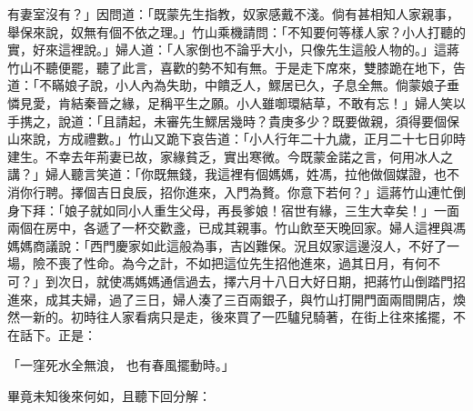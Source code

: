 有妻室沒有？」因問道：「既蒙先生指教，奴家感戴不淺。倘有甚相知人家親事，舉保來說，奴無有個不依之理。」竹山乘機請問：「不知要何等樣人家？小人打聽的實，好來這裡說。」婦人道：「人家倒也不論乎大小，只像先生這般人物的。」這蔣竹山不聽便罷，聽了此言，喜歡的勢不知有無。于是走下席來，雙膝跪在地下，告道：「不瞞娘子說，小人內為失助，中饋乏人，鰥居已久，子息全無。倘蒙娘子垂憐見愛，肯結秦晉之緣，足稱平生之願。小人雖啣環結草，不敢有忘！」婦人笑以手携之，說道：「且請起，未審先生鰥居幾時？貴庚多少？既要做親，須得要個保山來說，方成禮數。」竹山又跪下哀告道：「小人行年二十九歲，正月二十七日卯時建生。不幸去年荊妻已故，家緣貧乏，實出寒微。今既蒙金諾之言，何用冰人之講？」婦人聽言笑道：「你既無錢，我這裡有個媽媽，姓馮，拉他做個媒證，也不消你行聘。擇個吉日良辰，招你進來，入門為贅。你意下若何？」這蔣竹山連忙倒身下拜：「娘子就如同小人重生父母，再長爹娘！宿世有緣，三生大幸矣！」一面兩個在房中，各遞了一杯交歡盞，已成其親事。竹山飲至天晚回家。婦人這裡與馮媽媽商議說：「西門慶家如此這般為事，吉凶難保。況且奴家這邊沒人，不好了一場，險不喪了性命。為今之計，不如把這位先生招他進來，過其日月，有何不可？」到次日，就使馮媽媽通信過去，擇六月十八日大好日期，把蔣竹山倒踏門招進來，成其夫婦，過了三日，婦人湊了三百兩銀子，與竹山打開門面兩間開店，煥然一新的。初時往人家看病只是走，後來買了一匹驢兒騎著，在街上往來搖擺，不在話下。正是：

「一窪死水全無浪，  也有春風擺動時。」

畢竟未知後來何如，且聽下回分解：

